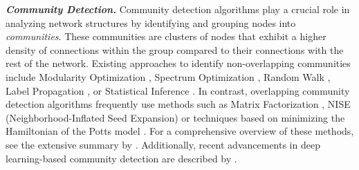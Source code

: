 

\textbf{\textit{Community Detection.}} Community detection algorithms play a crucial role in analyzing network structures by identifying and grouping nodes into \textit{communities}. These communities are clusters of nodes that exhibit a higher density of connections within the group compared to their connections with the rest of the network. 
Existing approaches to identify non-overlapping communities include Modularity Optimization \cite{louvain_detection_alg}, Spectrum Optimization \cite{spectrum_analysis}, Random Walk \cite{walktrap_detection_alg}, Label Propagation \cite{label_detection_alg}, or Statistical Inference \cite{mmsbm_detection_alg}. 
In contrast, overlapping community detection algorithms frequently use methods such as Matrix Factorization \cite{bigclam_detection_alg}, NISE (Neighborhood-Inflated Seed Expansion) \cite{nise} or techniques based on minimizing the Hamiltonian of the Potts model \cite{Ronhovde_2009}. For a comprehensive overview of these methods, see the extensive summary by \citet{community_detection_survey}.
Additionally, recent advancements in deep learning-based community detection are described by \citet{deepl_detection_alg}. 


